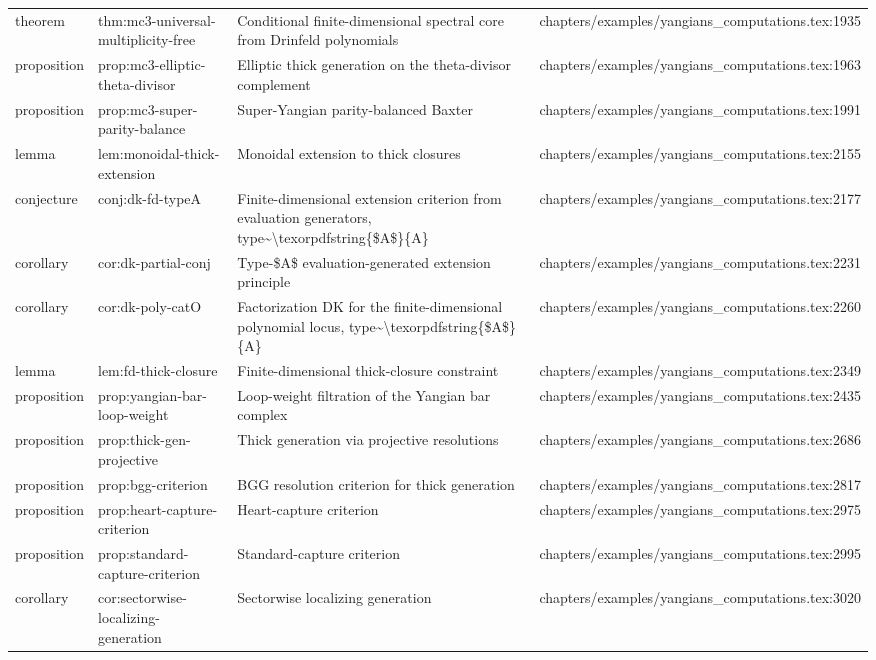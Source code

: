 \documentclass[11pt]{article}
\begin{document}
\begin{longtable}{L{0.10\textwidth}L{0.26\textwidth}L{0.42\textwidth}L{0.22\textwidth}}
theorem & thm:mc3-universal-multiplicity-free & Cond{}itional finite-dimensional spectral core from Drinfeld polynomials & chapters/examples/yangians\_computations.tex:1935\\
proposition & prop:mc3-elliptic-theta-divisor & Elliptic thick generation on the theta-divisor complement & chapters/examples/yangians\_computations.tex:1963\\
proposition & prop:mc3-super-parity-balance & Super-Yangian parity-balanced Baxter & chapters/examples/yangians\_computations.tex:1991\\
lemma & lem:monoidal-thick-extension & Monoidal extension to thick closures & chapters/examples/yangians\_computations.tex:2155\\
conjecture & conj:dk-fd-typeA & Finite-dimensional extension criterion from evaluation generators, type\textasciitilde{}\textbackslash{}texorpdfstring\{\$A\$\}\{A\} & chapters/examples/yangians\_computations.tex:2177\\
corollary & cor:dk-partial-conj & Type-\$A\$ evaluation-generated extension principle & chapters/examples/yangians\_computations.tex:2231\\
corollary & cor:dk-poly-catO & Factorization DK for the finite-dimensional polynomial locus, type\textasciitilde{}\textbackslash{}texorpdfstring\{\$A\$\}\{A\} & chapters/examples/yangians\_computations.tex:2260\\
lemma & lem:fd-thick-closure & Finite-dimensional thick-closure constraint & chapters/examples/yangians\_computations.tex:2349\\
proposition & prop:yangian-bar-loop-weight & Loop-weight filtration of the Yangian bar complex & chapters/examples/yangians\_computations.tex:2435\\
proposition & prop:thick-gen-projective & Thick generation via projective resolutions & chapters/examples/yangians\_computations.tex:2686\\
proposition & prop:bgg-criterion & BGG resolution criterion for thick generation & chapters/examples/yangians\_computations.tex:2817\\
proposition & prop:heart-capture-criterion & Heart-capture criterion & chapters/examples/yangians\_computations.tex:2975\\
proposition & prop:standard-capture-criterion & Standard-capture criterion & chapters/examples/yangians\_computations.tex:2995\\
corollary & cor:sectorwise-localizing-generation & Sectorwise localizing generation & chapters/examples/yangians\_computations.tex:3020\\

\end{longtable}
\end{document}
